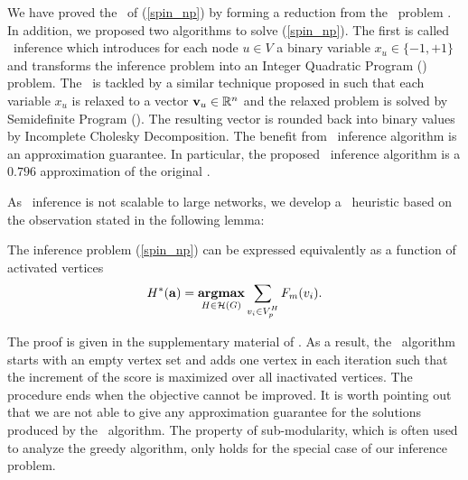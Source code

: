{We have proved the \nphardness\ of (\ref{spin_np}) by forming a reduction from the \maxcut\ problem \citep{Garey90computers}.
In addition, we proposed two algorithms to solve (\ref{spin_np}).
The first is called {\sdp\ inference} which introduces for each node $u\in V$ a binary variable $x_u\in\{-1,+1\}$ and transforms the inference problem into an Integer Quadratic Program (\iqp) problem.
The \iqp\ is tackled by a similar technique proposed in \citep{Geomans1995improved} such that each variable $x_u$ is relaxed to a vector $\mathbf {v}_u\in\mathbb{R}^n$ and the relaxed problem is solved by Semidefinite Program (\sdp). 
The resulting vector is rounded back into binary values by Incomplete Cholesky Decomposition.
The benefit from \sdp\ inference algorithm is an approximation guarantee. 
In particular, the proposed \sdp\ inference algorithm is a $0.796$ approximation of the original \iqp.

As \sdp\ inference is not scalable to large networks, we develop a \greedy\ heuristic based on the observation stated in the following lemma:
\begin{lemma}
	The inference problem (\ref{spin_np}) can be expressed equivalently as a function of activated vertices
	\begin{align*}
		H^{*}(\mathbf {a}) = \underset{{H \in {\cal H}(G)}}{\textbf{argmax}} \sum_{ \substack{v_i\in V^H_{\sc p}}}F_m(v_i). \nonumber 
	\end{align*}
\end{lemma}
\noindent
The proof is given in the supplementary material of . 
As a result, the \greedy\ algorithm starts with an empty vertex set and adds one vertex in each iteration such that the increment of the score is maximized over all inactivated vertices.
The procedure ends when the objective cannot be improved.  
It is worth pointing out that we are not able to give any approximation guarantee for the solutions produced by the \greedy\ algorithm.
The property of sub-modularity, which is often used to analyze the greedy algorithm, only holds for the special case of our inference problem.


}
